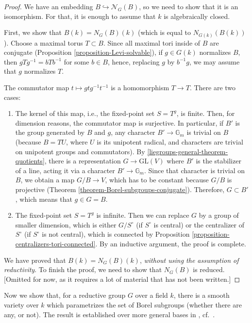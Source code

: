 \begin{proof}
 We have an embedding $B\hookrightarrow \mathcal N_G(B)$, so we need to show that it is an isomorphism. For that, it is enough to assume that $k$ is algebraically closed. 
 
 First, we show that $B(k) = N_G(B)(k)$ (which is equal to $N_{G(k)}(B(k))$). 
 Choose a maximal torus $T\subset B$. Since all maximal tori inside of $B$ are conjugate (Proposition \ref{proposition-Levi-solvable}), if $g\in G(k)$ normalizes $B$, then $gTg^{-1}=bTb^{-1}$ for some $b\in B$, hence, replacing $g$ by $b^{-1}g$, we may assume that $g$ normalizes $T$.
  
The commutator map $t\mapsto g t g^{-1} t^{-1}$ is a homomorphism $T\to T$. There are two cases:
\begin{enumerate}
 \item The kernel of this map, i.e., the fixed-point set $S=T^g$, is finite. Then, for dimension reasons, the commutator map is surjective. In particular, if $B'$ is the group generated by $B$ and $g$, any character $B'\to \mathbb G_m$ is trivial on $B$ (because $B=TU$, where $U$ is its unipotent radical, and characters are trivial on unipotent groups and commutators). By \ref{liegroups-general-theorem-quotients}, there is a representation $G\to \text{GL}(V)$ where $B'$ is the stabilizer of a line, acting it via a character $B'\to \mathbb G_m$. Since that character is trivial on $B$, we obtain a map $G/B\to V$, which has to be constant because $G/B$ is projective (Theorem \ref{theorem-Borel-subgroups-conjugate}). Therefore, $G\subset B'$, which means that $g\in G = B$. 
 
 \item The fixed-point set $S=T^g$ is infinite. Then we can replace $G$ by a group of smaller dimension, which is either $G/S^\circ$ (if $S^\circ$ is central) or the centralizer of $S^\circ$ (if $S^\circ$ is not central), which is connected by Proposition \ref{proposition-centralizers-tori-connected}. By an inductive argument, the proof is complete.
\end{enumerate}

 We have proved that $B(k) = N_G(B)(k)$, \emph{without using the assumption of reductivity}. To finish the proof, we need to show that $N_G(B)$ is reduced. [Omitted for now, as it requires a lot of material that has not been written.]
\end{proof}




Now we show that, for a reductive group $G$ over a field $k$, there is a smooth variety over $k$ which parametrizes the set of Borel subgroups (whether there are any, or not). The result is established over more general bases in \cite[XXII, Corollaire 5.8.3]{SGA3}, cf.\ \cite[Corollary 5.2.9]{Conrad-RGS}. 

